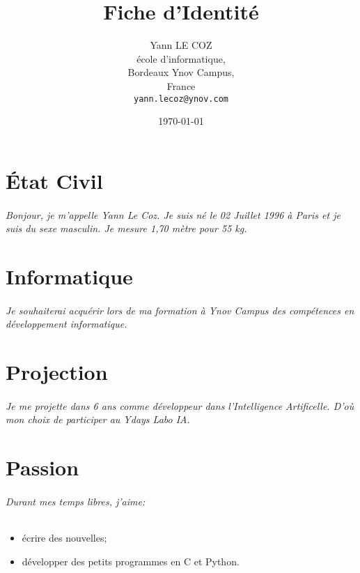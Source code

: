 \documentclass{report}
\title{Fiche d'Identité}
\author{Yann LE COZ\\
   école d'informatique,\\
   Bordeaux Ynov Campus,\\
   France\\
   \texttt{yann.lecoz@ynov.com}}
\date{\today}
\begin{document}
    \maketitle
    \tableofcontents

\part{État Civil}
\paragraph{Bonjour, je m'appelle Yann Le Coz. Je suis né le 02 Juillet 1996 à Paris et je suis du sexe masculin. Je mesure 1,70 mètre pour 55 kg.}
\part{Informatique}
\paragraph{Je souhaiterai acquérir lors de ma formation à \textit{Ynov Campus} des compétences en développement informatique.}
\part{Projection}
\paragraph{Je me projette dans 6 ans comme développeur dans l'Intelligence Artificelle. D'où mon choix de participer au \textit{Ydays Labo IA}.}
\part{Passion}
\paragraph{ Durant mes temps libres, j'aime:} \begin{itemize}
    \item écrire des nouvelles;
    \item développer des petits programmes en C et Python.
\end{itemize}
\end{document}

